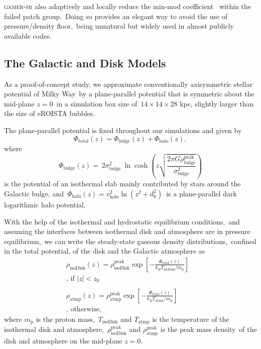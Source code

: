 \documentclass[twocolumn]{aastex631}
\begin{document}
  \textsc{gamer-sr} also adaptively and locally reduce the min-mod coefficient\
  \citep{tseng2021} within the failed patch group.\
  Doing so provides an elegant way to avoid the use of pressure/density floor,\
  being unnatural but widely used in almost publicly available codes.\

  \subsection{The Galactic and Disk Models}
  As a proof-of-concept study, we approximate conventionally axisymmetric stellar potential of Milky Way\
  by a plane-parallel potential that is symmetric about the mid-plane $z=0$\
  in a simulation box size of\
  $14\times14\times28$ kpc, slightly larger than the size of eROISTA bubbles.

  The plane-parallel potential is fixed throughout our simulations and given by
  \begin{equation}
    \Phi_{\text{total}}(z) = \Phi_{\text{bulge}}(z) + \Phi_{\text{halo}}(z),
  \end{equation}
  where
  \begin{equation}
    \Phi_{\text{bulge}}(z)=\
    2\sigma^2_{\text{bulge}}\
    \ln\cosh\left(z\sqrt{\frac{2\pi G\rho_{\text{bulge}}^{\text{peak}}}{\sigma^2_{\text{bulge}}}}\right)
  \end{equation}
  is the potential of an isothermal slab mainly contributed by stars around the Galactic bulge, and\
  $\Phi_{\text{halo}}(z)=v^2_{\text{halo}}\ln\left(z^2+d^2_{\text{h}}\right)$\
  is a plane-parallel dark logarithmic halo potential.

  With the help of the isothermal and hydrostatic equilibrium conditions,\
  and assuming the interfaces between isothermal disk and atmosphere are in pressure equilibrium,\
  we can write the steady-state gaseous density distributions,\
  confined in the total potential, of the disk and the Galactic atmosphere as\
  \begin{subequations}
  \begin{align}
     \displaystyle \rho_{\text{isoDisk}}(z) = \rho_{\text{isoDisk}}^{\text{peak}}
     \exp\left[-\frac{\Phi_{\text{total}}(z)}{k_{B}T_{\text{isoDisk}}/m_{\text{p}}}\right]&\label{isothermal-disk-density}\\
     \text{, if $|z| < z_{0}$}& \nonumber \\
     \nonumber\\
     \displaystyle \rho_{\text{atmp}}(z) = \rho_{\text{atmp}}^{\text{peak}}
     \exp\left[-\frac{\Phi_{\text{total}}(z)}{k_{B}T_{\text{atmp}}/m_{\text{p}}}\right]&\label{isothermal-atmp-density}\\
     \text{, otherwise,}& \nonumber
  \end{align}
  \label{disk-atm-sys}
  \end{subequations}
  where $m_{\text{p}}$ is the proton mass,\
  $T_{\text{isoDisk}}$ and $T_{\text{atmp}}$ is the temperature of the isothermal disk and atmosphere,\
  $\rho_{\text{isoDisk}}^{\text{peak}}$ and $\rho_{\text{atmp}}^{\text{peak}}$ is the peak mass density\
  of the disk and atmosphere on the mid-plane $z=0$.
\end{document}
